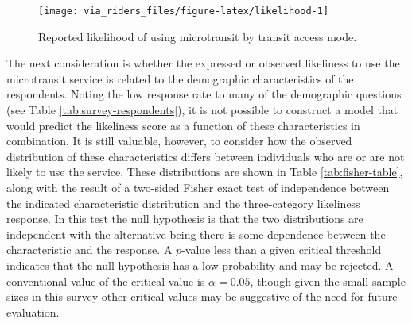 \documentclass[smartcities,article,submit,moreauthors,pdftex]{mdpi}
\begin{document}
\begin{figure}
\texttt{[image: via\_riders\_files/figure-latex/likelihood-1]} \caption{Reported likelihood of using microtransit by transit access mode.}\label{fig:likelihood}
\end{figure}

The next consideration is whether the expressed or observed likeliness to use
the microtransit service is related to the demographic characteristics of the
respondents. Noting the low response rate to many of the demographic questions
(see Table \ref{tab:survey-respondents}), it is not possible to construct a model
that would predict the likeliness score as a function of these characteristics
in combination. It is still valuable, however, to consider how the observed
distribution of these characteristics differs between individuals who are or are
not likely to use the service. These distributions are shown in Table
\ref{tab:fisher-table}, along with the result of a two-sided Fisher exact test of
independence between the indicated characteristic distribution and the
three-category likeliness response. In this test the null hypothesis is that the
two distributions are independent with the alternative being there is some
dependence between the characteristic and the response. A \(p\)-value less than a
given critical threshold indicates that the null hypothesis has a low
probability and may be rejected. A conventional value of the critical value
is \(\alpha=0.05\), though given the small sample sizes in this survey other
critical values may be suggestive of the need for future evaluation.
\end{document}
